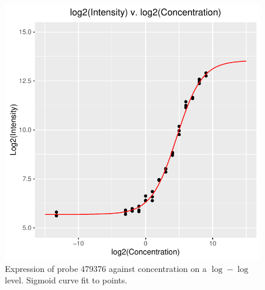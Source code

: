 \documentclass[reqno,12pt,oneside]{report}\usepackage[]{graphicx}\usepackage[]{color}
\makeatletter
\def\maxwidth{ %
  \ifdim\Gin@nat@width>\linewidth
    \linewidth
  \else
    \Gin@nat@width
  \fi
}
\newenvironment{knitrout}{}{} %
\renewenvironment{knitrout}{\begin{small}}{\end{small}}
\theoremstyle{plain}
\theoremstyle{definition}
\theoremstyle{remark}
\numberwithin{theorem}{chapter}     %
\makeatother
\begin{document}
\begin{figure}[ht]
  \centering
\begin{knitrout}
\color{fgcolor}
\includegraphics[width=\maxwidth]{figure/chap4-fig2-1} 

\end{knitrout}
\caption{Expression of probe 479376 against concentration on a $\log-\log$ level. Sigmoid curve fit to points.}
  \label{fig:c2}
\end{figure}
\end{document}
